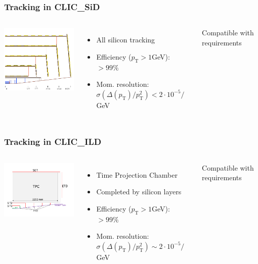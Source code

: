 \documentclass{beamer}
\begin{document}
\begin{frame}
\frametitle{Tracking in CLIC\_SiD}
\begin{columns}[c]
\column{6cm}
\begin{center}
\includegraphics[width=6cm]{sid_tracker_zx.pdf}
\end{center}
\column{6cm}
\begin{itemize}
  \item All silicon tracking
  \item Efficiency ($p_{\textrm{T}}>1$GeV): $>99\%$
  \item Mom. resolution: $\sigma(\Delta(p_{\textrm{T}})/p_{\textrm{T}}^2)<
  2\cdot10^{-5}/$GeV
\end{itemize}
\alert{Compatible with requirements}
\end{columns}
\end{frame}
\begin{frame}
\frametitle{Tracking in CLIC\_ILD}
\begin{columns}[c]
\column{6cm}
\begin{center}
\includegraphics[width=6cm]{CLIC_ILD_tracking_geom.pdf}
\end{center}
\column{6cm}
\begin{itemize}
  \item Time Projection Chamber
  \item Completed by silicon layers
  \item Efficiency ($p_{\textrm{T}}>1$GeV): $>99\%$
  \item Mom. resolution: $\sigma(\Delta(p_{\textrm{T}})/p_{\textrm{T}}^2)\sim 2\cdot10^{-5}/$GeV
\end{itemize}
\alert{Compatible with requirements}
\end{columns}
\end{frame}
\end{document}

